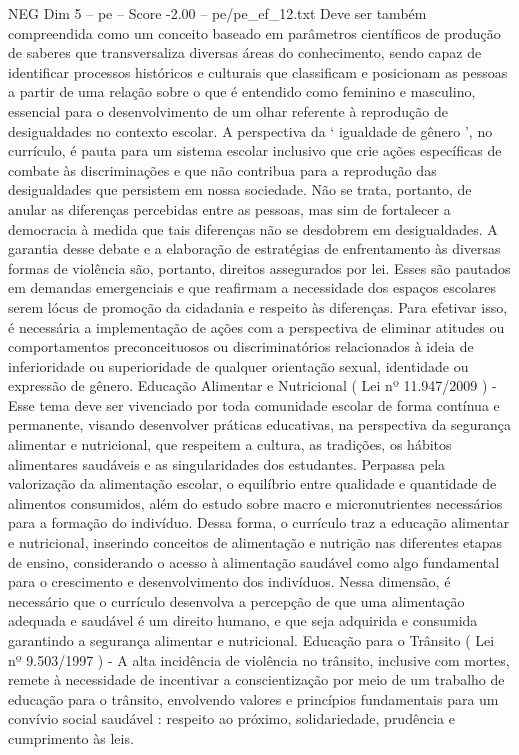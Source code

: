 \begin{textsample}{NEG Dim 5 – pe – Score -2.00 – pe/pe\_ef\_12.txt}
Deve ser também compreendida como um conceito baseado em parâmetros científicos de produção de saberes que transversaliza diversas áreas do conhecimento, sendo capaz de identificar processos históricos e culturais que classificam e posicionam as pessoas a partir de uma relação sobre o que é entendido como feminino e masculino, essencial para o desenvolvimento de um olhar referente à reprodução de desigualdades no contexto escolar.
A perspectiva da ‘ igualdade de gênero ’, no currículo, é pauta para um sistema escolar inclusivo que crie ações específicas de combate às discriminações e que não contribua para a reprodução das desigualdades que persistem em nossa sociedade.
Não se trata, portanto, de anular as diferenças percebidas entre as pessoas, mas sim de fortalecer a democracia à medida que tais diferenças não se desdobrem em desigualdades.
A garantia desse debate e a elaboração de estratégias de enfrentamento às diversas formas de violência são, portanto, direitos assegurados por lei.
Esses são pautados em demandas emergenciais e que reafirmam a necessidade dos espaços escolares serem lócus de promoção da cidadania e respeito às diferenças.
Para efetivar isso, é necessária a implementação de ações com a perspectiva de eliminar atitudes ou comportamentos preconceituosos ou discriminatórios relacionados à ideia de inferioridade ou superioridade de qualquer orientação sexual, identidade ou expressão de gênero.
Educação Alimentar e Nutricional ( Lei nº 11.947/2009 ) - Esse tema deve ser vivenciado por toda comunidade escolar de forma contínua e permanente, visando desenvolver práticas educativas, na perspectiva da segurança alimentar e nutricional, que respeitem a cultura, as tradições, os hábitos alimentares saudáveis e as singularidades dos estudantes.
Perpassa pela valorização da alimentação escolar, o equilíbrio entre qualidade e quantidade de alimentos consumidos, além do estudo sobre macro e micronutrientes necessários para a formação do indivíduo.
Dessa forma, o currículo traz a educação alimentar e nutricional, inserindo conceitos de alimentação e nutrição nas diferentes etapas de ensino, considerando o acesso à alimentação saudável como algo fundamental para o crescimento e desenvolvimento dos indivíduos.
Nessa dimensão, é necessário que o currículo desenvolva a percepção de que uma alimentação adequada e saudável é um direito humano, e que seja adquirida e consumida garantindo a segurança alimentar e nutricional.
Educação para o Trânsito ( Lei nº 9.503/1997 ) - A alta incidência de violência no trânsito, inclusive com mortes, remete à necessidade de incentivar a conscientização por meio de um trabalho de educação para o trânsito, envolvendo valores e princípios fundamentais para um convívio social saudável : respeito ao próximo, solidariedade, prudência e cumprimento às leis.

\end{textsample}
